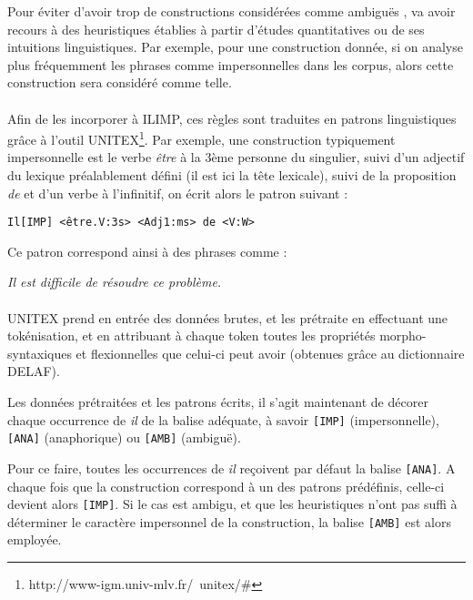 \documentclass[a4paper,12pt]{article}
\begin{document}
Pour éviter d'avoir trop de constructions considérées comme \og ambiguës \fg{}, \citeauthor{danlos-ilimp-taln2005} va avoir recours à des heuristiques établies à partir d'études quantitatives ou de ses intuitions linguistiques. Par exemple, pour une construction donnée, si on analyse plus fréquemment les phrases comme impersonnelles dans les corpus, alors cette construction sera considéré comme telle.

\paragraph*{}
Afin de les incorporer à ILIMP, ces règles sont traduites en patrons linguistiques grâce à l'outil UNITEX\footnote{http://www-igm.univ-mlv.fr/~unitex/\#}. Par exemple, une construction typiquement impersonnelle est le verbe \og \textit{être} \fg{} à la 3ème personne du singulier, suivi d'un adjectif du lexique préalablement défini (il est ici la tête lexicale), suivi de la proposition \og \textit{de} \fg{} et d'un verbe à l'infinitif, on écrit alors le patron suivant :

\verb!Il[IMP] <être.V:3s> <Adj1:ms> de <V:W>!

Ce patron correspond ainsi à des phrases comme :

\og{}\textit{Il est difficile de résoudre ce problème.}\fg{}

\paragraph{}
UNITEX prend en entrée des données brutes, et les prétraite en effectuant une tokénisation, et en attribuant à chaque token toutes les propriétés morpho-syntaxiques et flexionnelles que celui-ci peut avoir (obtenues grâce au dictionnaire DELAF).

Les données prétraitées et les patrons écrits, il s'agit maintenant de décorer chaque occurrence de \og \textit{il} \fg{} de la balise adéquate, à savoir \verb![IMP]! (impersonnelle),  \verb![ANA]! (anaphorique) ou \verb![AMB]! (ambiguë).

Pour ce faire, toutes les occurrences de \og \textit{il} \fg{} reçoivent par défaut la balise \verb![ANA]!. A chaque fois que la construction correspond à un des patrons prédéfinis, celle-ci devient alors \verb![IMP]!. Si le cas est ambigu, et que les heuristiques n'ont pas suffi à déterminer le caractère impersonnel de la construction, la balise \verb![AMB]! est alors employée.
\end{document}
